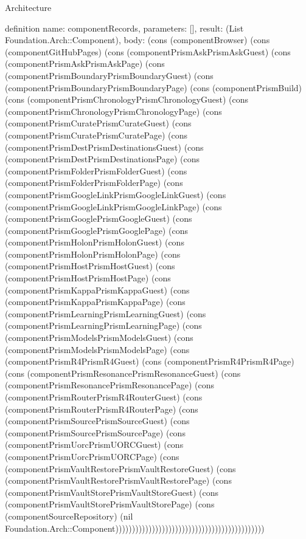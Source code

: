 \begin{lexlean}{Architecture}
\begin{semanticmodule}
definition{
  name: componentRecords,
  parameters: [],
  result: (List Foundation.Arch::Component),
  body: (cons (componentBrowser) (cons (componentGitHubPages) (cons (componentPrismAskPrismAskGuest) (cons (componentPrismAskPrismAskPage) (cons (componentPrismBoundaryPrismBoundaryGuest) (cons (componentPrismBoundaryPrismBoundaryPage) (cons (componentPrismBuild) (cons (componentPrismChronologyPrismChronologyGuest) (cons (componentPrismChronologyPrismChronologyPage) (cons (componentPrismCuratePrismCurateGuest) (cons (componentPrismCuratePrismCuratePage) (cons (componentPrismDestPrismDestinationsGuest) (cons (componentPrismDestPrismDestinationsPage) (cons (componentPrismFolderPrismFolderGuest) (cons (componentPrismFolderPrismFolderPage) (cons (componentPrismGoogleLinkPrismGoogleLinkGuest) (cons (componentPrismGoogleLinkPrismGoogleLinkPage) (cons (componentPrismGooglePrismGoogleGuest) (cons (componentPrismGooglePrismGooglePage) (cons (componentPrismHolonPrismHolonGuest) (cons (componentPrismHolonPrismHolonPage) (cons (componentPrismHostPrismHostGuest) (cons (componentPrismHostPrismHostPage) (cons (componentPrismKappaPrismKappaGuest) (cons (componentPrismKappaPrismKappaPage) (cons (componentPrismLearningPrismLearningGuest) (cons (componentPrismLearningPrismLearningPage) (cons (componentPrismModelsPrismModelsGuest) (cons (componentPrismModelsPrismModelsPage) (cons (componentPrismR4PrismR4Guest) (cons (componentPrismR4PrismR4Page) (cons (componentPrismResonancePrismResonanceGuest) (cons (componentPrismResonancePrismResonancePage) (cons (componentPrismRouterPrismR4RouterGuest) (cons (componentPrismRouterPrismR4RouterPage) (cons (componentPrismSourcePrismSourceGuest) (cons (componentPrismSourcePrismSourcePage) (cons (componentPrismUorcPrismUORCGuest) (cons (componentPrismUorcPrismUORCPage) (cons (componentPrismVaultRestorePrismVaultRestoreGuest) (cons (componentPrismVaultRestorePrismVaultRestorePage) (cons (componentPrismVaultStorePrismVaultStoreGuest) (cons (componentPrismVaultStorePrismVaultStorePage) (cons (componentSourceRepository) (nil Foundation.Arch::Component)))))))))))))))))))))))))))))))))))))))))))))
}


\end{semanticmodule}
\end{lexlean}
